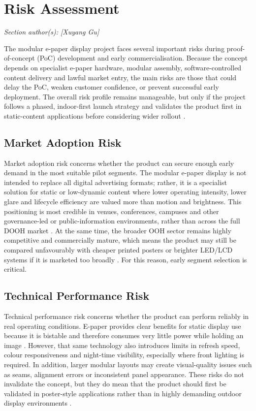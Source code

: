 \documentclass[11pt,a4paper]{article}
\begin{document}
\section{Risk Assessment}
\textit{Section author(s): [Xuyang Gu]}

The modular e-paper display project faces several important risks during proof-of-concept (PoC) development and early commercialisation. Because the concept depends on specialist e-paper hardware, modular assembly, software-controlled content delivery and lawful market entry, the main risks are those that could delay the PoC, weaken customer confidence, or prevent successful early deployment. The overall risk profile remains manageable, but only if the project follows a phased, indoor-first launch strategy and validates the product first in static-content applications before considering wider rollout \cite{ref6,ref2,ref4}.

\subsection{Market Adoption Risk}

Market adoption risk concerns whether the product can secure enough early demand in the most suitable pilot segments. The modular e-paper display is not intended to replace all digital advertising formats; rather, it is a specialist solution for static or low-dynamic content where lower operating intensity, lower glare and lifecycle efficiency are valued more than motion and brightness. This positioning is most credible in venues, conferences, campuses and other governance-led or public-information environments, rather than across the full DOOH market \cite{ref6}. At the same time, the broader OOH sector remains highly competitive and commercially mature, which means the product may still be compared unfavourably with cheaper printed posters or brighter LED/LCD systems if it is marketed too broadly \cite{ref4}. For this reason, early segment selection is critical.

\subsection{Technical Performance Risk}

Technical performance risk concerns whether the product can perform reliably in real operating conditions. E-paper provides clear benefits for static display use because it is bistable and therefore consumes very little power while holding an image \cite{ref2}. However, that same technology also introduces limits in refresh speed, colour responsiveness and night-time visibility, especially where front lighting is required. In addition, larger modular layouts may create visual-quality issues such as seams, alignment errors or inconsistent panel appearance. These risks do not invalidate the concept, but they do mean that the product should first be validated in poster-style applications rather than in highly demanding outdoor display environments \cite{ref2}.
\end{document}
